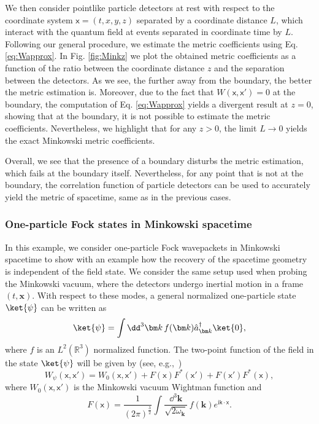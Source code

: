 \documentclass[letterpaper,12pt,titlepage,oneside,final]{book}
\newcommand{\mf}{\mathsf}%
\newcommand{\ii}{\mathrm{i}}
\begin{document}
    We then consider pointlike particle detectors at rest with respect to the coordinate system $\mf x = (t,x,y,z)$ separated by a coordinate distance $L$, which interact with the quantum field at events separated in coordinate time by $L$. Following our general procedure, we estimate the metric coefficients using Eq. \eqref{eq:Wapprox}. In Fig. \ref{fig:Minkz} we plot the obtained metric coefficients as a function of the ratio between the coordinate distance $z$ and the separation between the detectors. As we see, the further away from the boundary, the better the metric estimation is. Moreover, due to the fact that $W(\mf x,\mf x') = 0$ at the boundary, the computation of Eq. \eqref{eq:Wapprox} yields a divergent result at $z = 0$, showing that at the boundary, it is not possible to estimate the metric coefficients. Nevertheless, we highlight that for any $z>0$, the limit $L \to 0$ yields the exact Minkowski metric coefficients. 
    
    Overall, we see that the presence of a boundary disturbs the metric estimation, which fails at the boundary itself. Nevertheless, for any point that is not at the boundary, the correlation function of particle detectors can be used to accurately yield the metric of spacetime, same as in the previous cases.
    
    
    \subsubsection*{One-particle Fock states in Minkowski spacetime}
    
    In this example, we consider one-particle Fock wavepackets in Minkowski spacetime to show with an example how the recovery of the spacetime geometry is independent of the field state. We consider the same setup used when probing the Minkowski vacuum, where the detectors undergo inertial motion in a frame $(t,\bm x)$. With respect to these modes, a general normalized one-particle state $\ket{\psi}$ can be written as
    \begin{equation}
        \ket{\psi} = \int \dd^3 \bm k \,f(\bm k) \hat{a}^\dagger_{\bm k} \ket{0},
    \end{equation}
    where $f$ is an $L^2(\mathbb{R}^3)$ normalized function. The two-point function of the field in the state $\ket{\psi}$ will be given by (see, e.g.,~\cite{antiparticles})
    \begin{equation}
        W_\psi(\mf x,\mf x') =  W_0(\mf x,\mf x') + F(\mf x) F^*(\mf x') + F(\mf x') F^*(\mf x),
    \end{equation}
    where $W_0(\mf x,\mf x')$ is the Minkowski vacuum Wightman function and
    \begin{equation}
        F(\mf x) = \frac{1}{(2\pi)^{\frac{3}{2}}}\int \frac{\dd^3 \bm k}{\sqrt{2 \omega_{\bm k}}} \, f(\bm k) e^{\ii \mf k \cdot\mf x}.
    \end{equation}
    
\end{document}
